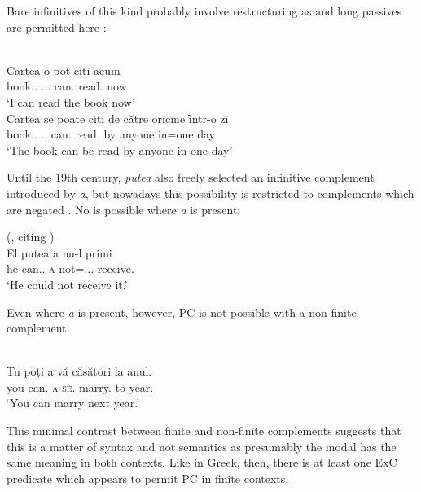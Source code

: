 \documentclass[output=paper]{langsci/langscibook}
\begin{document}
Bare infinitives of this kind probably involve restructuring as 
and long passives are permitted here \citep[194, 196]{Dragomirescu2013}:

\ea%
    \label{ex:24.36}\\
	\gll Cartea     o       pot   citi   acum\\
        book.\Def{}.\Acc{}   \Cl.\Acc{}.\glossF.\Tsg{}   can.\Fsg{}   read.\Inf{} now\\
	\glt ‘I can read the book now’
\ex%
    \label{ex:24.37}\\
	\gll Cartea     se          poate      citi   de {către oricine} ȋntr-o zi\\
    book.\Def{}.\Nom{}   \Cl.\Refl.\Pass{} can.\Tsg{} read.\Inf{}   by anyone   in=one day\\
	\glt ‘The book can be read by anyone in one day’
\z

Until the 19th century, \emph{putea} also freely selected an infinitive
complement introduced by \emph{a}, but nowadays this possibility is restricted
to complements which are negated \citep{Dragomirescu2013}. No 
is possible where \emph{a} is present:

\ea%
    \label{ex:24.38} (\citealt[194]{PanaDindelegan2013}, citing \citealt[60]{Jordan2009})\\
	\gll El putea       a   nu-l       primi\\
    he can.\Ipfv{}.\Tsg{}   \textsc{a}   not=\Cl.\Acc{}.\M.\Tsg{}   receive.\Inf{}\\
	\glt ‘He could not receive it.’
\z

Even where \emph{a} is present, however, \gls{PC} is not possible with a non-finite complement:

\ea%
    \label{ex:24.39}\\
	\gll \llap{*}Tu   poți   a vă     căsători   la anul.\\
        you   can.\Ssg{} \textsc{a} \textsc{se}.\Spl{}  marry.\Inf{}   to year.\Def{}\\
    \glt ‘You can marry next year.’
\z

This minimal contrast between finite and non-finite complements suggests that
this is a matter of syntax and not semantics as presumably the modal has the
same meaning in both contexts. Like in Greek, then, there is at least one
\gls{ExC} predicate which appears to permit
\gls{PC} in finite  contexts.
\end{document}
